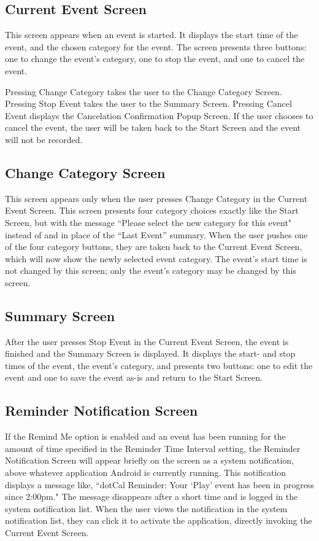 \documentclass[11pt]{article}
\newcommand{\bt}[1]{{\sc #1}}
\begin{document}
\subsection{Current Event Screen}

This screen appears when an event is started. It displays the start time of the event, and the chosen category for the event. The screen presents three buttons: one to change the event's category, one to stop the event, and one to cancel the event.

Pressing \bt{Change Category} takes the user to the Change Category Screen. Pressing \bt{Stop Event} takes the user to the Summary Screen. Pressing \bt{Cancel Event} displays the Cancelation Confirmation Popup Screen. If the user chooses to cancel the event, the user will be taken back to the Start Screen and the event will not be recorded.

\subsection{Change Category Screen}

This screen appears only when the user presses \bt{Change Category} in the Current Event Screen. This screen presents four category choices exactly like the Start Screen, but with the message ``Please select the new category for this event" instead of and in place of the ``Last Event'' summary. When the user pushes one of the four category buttons, they are taken back to the Current Event Screen, which will now show the newly selected event category. The event's start time is not changed by this screen; only the event's category may be changed by this screen.

\subsection{Summary Screen}

After the user presses \bt{Stop Event} in the Current Event Screen, the event is finished and the Summary Screen is displayed. It displays the start- and stop times of the event, the event's category, and presents two buttons: one to edit the event and one to save the event as-is and return to the Start Screen.

\subsection{Reminder Notification Screen}

If the Remind Me option is enabled and an event has been running for the amount of time specified in the Reminder Time Interval setting, the Reminder Notification Screen will appear briefly on the screen as a system notification, above whatever application Android is currently running. This notification displays a message like, ``dotCal Reminder: Your `Play' event has been in progress since 2:00pm." The message disappears after a short time and is logged in the system notification list. When the user views the notification in the system notification list, they can click it to activate the application, directly invoking the Current Event Screen. 
\end{document}
